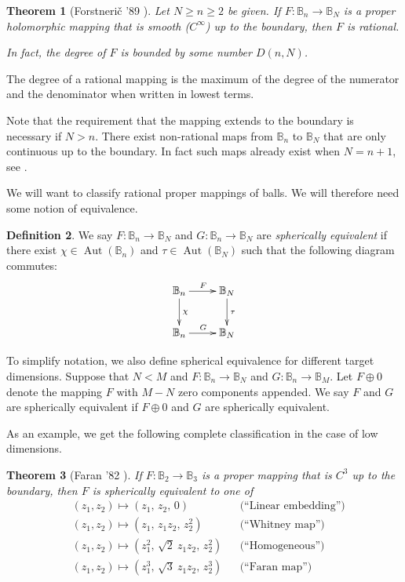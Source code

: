 \documentclass[12pt,openany]{book}
\newcommand{\Aut}{\operatorname{Aut}}
\newcommand{\bB}{{\mathbb{B}}}
\newcommand{\myindex}[1]{#1\index{#1}}
\theoremstyle{plain}
\newtheorem{thm}{Theorem}[section]
\theoremstyle{remark}
\theoremstyle{definition}
\newtheorem{defn}[thm]{Definition}
\theoremstyle{exercise}
\theoremstyle{example}
\begin{document}
\begin{thm}[Forstneri{\v c} '89 \cite{Forstneric89}]
Let $N \geq n \geq 2$ be given.
If $F \colon \bB_n \to \bB_N$ is a proper holomorphic
mapping that is smooth ($C^\infty$)
up to the boundary, then $F$ is rational.

In fact, the degree of $F$ is bounded by some number
$D(n,N)$.
\end{thm}

The degree of a rational mapping is the maximum of the degree of the
numerator and the denominator when written in lowest terms.

Note that the requirement that the mapping extends to the boundary is
necessary if $N > n$.
There exist non-rational maps from $\bB_n$ to $\bB_N$ that
are only continuous up to the boundary.
In fact such maps already exist when $N=n+1$, see \cite{Dor}.

We will want to classify rational proper mappings of balls.  We will
therefore need some notion of equivalence.

\begin{defn}
We say
$F \colon \bB_n \to \bB_N$ and
$G \colon \bB_n \to \bB_N$ are \emph{\myindex{spherically equivalent}} if
there exist 
$\chi \in \Aut(\bB_n)$ and 
$\tau \in \Aut(\bB_N)$ such that the following diagram commutes:
\begin{equation}
\xymatrix{
\bB_n \ar[d]^{\chi} \ar[r]^F & \bB_N \ar[d]^{\tau} \\
\bB_n \ar[r]^G          & \bB_N }
\end{equation}

To simplify notation, we also define spherical equivalence for different
target dimensions.
Suppose that $N < M$ and 
$F \colon \bB_n \to \bB_N$ and
$G \colon \bB_n \to \bB_M$.  Let $F \oplus 0$ denote the mapping $F$
with $M-N$ zero components appended.  We say $F$ and $G$
are spherically equivalent if $F \oplus 0$ and $G$ are spherically
equivalent.
\end{defn}

As an example, we get the following complete classification in the
case of low dimensions.

\begin{thm}[Faran '82 \cite{FaranB2B3}]
If $F \colon \bB_2 \to \bB_3$
is a proper mapping that is $C^3$ up to the boundary,
then $F$ is spherically equivalent to one of
\begin{align*}
& (z_1,z_2) \mapsto (z_1, \, z_2, \, 0) & & \text{(``Linear embedding'')} \\
& (z_1,z_2) \mapsto (z_1, \, z_1z_2, \, z_2^2) & & \text{(``Whitney map'')} \\
& (z_1,z_2) \mapsto (z_1^2, \, \sqrt{2}~z_1z_2, \, z_2^2) & &
\text{(``Homogeneous'')} \\
& (z_1,z_2) \mapsto (z_1^3, \, \sqrt{3}~z_1z_2, \, z_2^3) & & \text{(``Faran
map'')}
\end{align*}
\end{thm}
\end{document}
